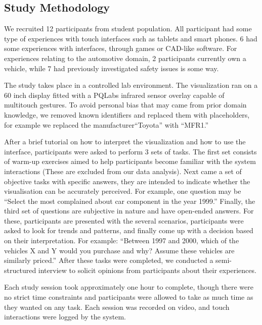 \subsection{Study Methodology}
We recruited 12 participants from student population. All participant had some
type of experiences with touch interfaces such as tablets and smart phones. 6
had some experiences with \threed interfaces, through games or CAD-like
software. For experiences relating to the automotive domain, 2 participants
currently own a vehicle, while 7 had previously investigated safety issues is
some way. 
 

The study takes place in a controlled lab environment. The visualization ran on
a 60 inch display fitted with a PQLabs infrared sensor overlay capable of
multitouch gestures. To avoid personal bias that may came from prior domain
knowledge, we removed known identifiers and replaced them with placeholders, for
example we replaced the manufacturer``Toyota'' with ``MFR1.''

After a brief tutorial on how to interpret the visualization and how to use the
interface, participants were asked to perform 3 sets of tasks. The first set
consists of warm-up exercises aimed to help participants become familiar with the system
interactions (These are excluded from our data analysis). Next came a set of
objective tasks with specific answers, they are intended to indicate whether the
\threed visualisation can be accurately perceived. For example, one question may
be ``Select the most complained about car component in the year 1999.'' Finally,
the third set of questions are subjective in nature and have open-ended answers.
For these, participants are presented with the several scenarios, participants
were asked to look for trends and patterns, and finally come up with a decision
based on their interpretation. For example: ``Between 1997 and 2000, which of
the vehicles X and Y would you purchase and why? Assume these vehicles are
similarly priced.'' After these tasks were completed, we conducted a
semi-structured interview to solicit opinions from participants about their
experiences. 

Each study session took approximately one hour to complete, though there were no
strict time constraints and participants were allowed to take as much time as
they wanted on any task. Each session was recorded on video, and touch
interactions were logged by the system.
 


